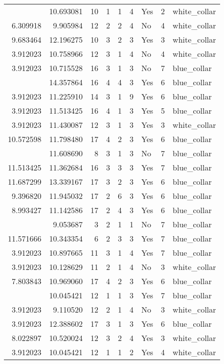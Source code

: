 \documentclass[
]{article}
\begin{document}
\begin{longtable}[t]{rrrrrllrl}
\addlinespace
3.912023 & 10.693081 & 10 & 1 & 1 & 4 & Yes & 2 & white\_collar\\
6.309918 & 9.905984 & 12 & 2 & 2 & 4 & No & 4 & white\_collar\\
9.683464 & 12.196275 & 10 & 3 & 2 & 3 & Yes & 3 & white\_collar\\
3.912023 & 10.758966 & 12 & 3 & 1 & 4 & No & 4 & white\_collar\\
3.912023 & 10.715528 & 16 & 3 & 1 & 3 & No & 7 & blue\_collar\\
\addlinespace
9.854822 & 14.357864 & 16 & 4 & 4 & 3 & Yes & 6 & blue\_collar\\
3.912023 & 11.225910 & 14 & 3 & 1 & 9 & Yes & 6 & blue\_collar\\
3.912023 & 11.513425 & 16 & 4 & 1 & 3 & Yes & 5 & blue\_collar\\
3.912023 & 11.430087 & 12 & 3 & 1 & 3 & Yes & 3 & white\_collar\\
10.572598 & 11.798480 & 17 & 4 & 2 & 3 & Yes & 6 & blue\_collar\\
\addlinespace
3.912023 & 11.608690 & 8 & 3 & 1 & 3 & No & 7 & blue\_collar\\
11.513425 & 11.362684 & 16 & 3 & 3 & 3 & Yes & 7 & blue\_collar\\
11.687299 & 13.339167 & 17 & 3 & 2 & 3 & Yes & 6 & blue\_collar\\
9.396820 & 11.945032 & 17 & 2 & 6 & 3 & Yes & 6 & blue\_collar\\
8.993427 & 11.142586 & 17 & 2 & 4 & 3 & Yes & 6 & blue\_collar\\
\addlinespace
3.912023 & 9.053687 & 3 & 2 & 1 & 1 & No & 7 & blue\_collar\\
11.571666 & 10.343354 & 6 & 2 & 3 & 3 & Yes & 7 & blue\_collar\\
3.912023 & 10.897665 & 11 & 3 & 1 & 4 & Yes & 7 & blue\_collar\\
3.912023 & 10.128629 & 11 & 2 & 1 & 4 & No & 3 & white\_collar\\
7.803843 & 10.969060 & 17 & 4 & 2 & 3 & Yes & 6 & blue\_collar\\
\addlinespace
3.912023 & 10.045421 & 12 & 1 & 1 & 3 & Yes & 7 & blue\_collar\\
3.912023 & 9.110520 & 12 & 2 & 1 & 4 & No & 3 & white\_collar\\
3.912023 & 12.388602 & 17 & 3 & 1 & 3 & Yes & 6 & blue\_collar\\
8.022897 & 10.520024 & 12 & 3 & 2 & 4 & Yes & 3 & white\_collar\\
3.912023 & 10.045421 & 12 & 1 & 1 & 2 & Yes & 4 & white\_collar\\

\end{longtable}
\end{document}

